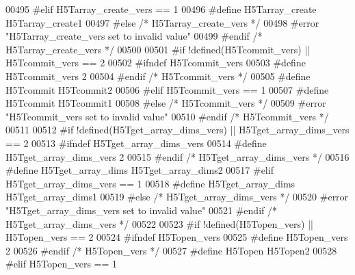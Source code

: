\begin{DoxyCode}
00495 \textcolor{preprocessor}{#elif H5Tarray\_create\_vers == 1}
00496 \textcolor{preprocessor}{  #define H5Tarray\_create H5Tarray\_create1}
00497 \textcolor{preprocessor}{#else }\textcolor{comment}{/* H5Tarray\_create\_vers */}\textcolor{preprocessor}{}
00498 \textcolor{preprocessor}{  #error "H5Tarray\_create\_vers set to invalid value"}
00499 \textcolor{preprocessor}{#endif }\textcolor{comment}{/* H5Tarray\_create\_vers */}\textcolor{preprocessor}{}
00500 
00501 \textcolor{preprocessor}{#if !defined(H5Tcommit\_vers) || H5Tcommit\_vers == 2}
00502 \textcolor{preprocessor}{  #ifndef H5Tcommit\_vers}
00503 \textcolor{preprocessor}{    #define H5Tcommit\_vers 2}
00504 \textcolor{preprocessor}{  #endif }\textcolor{comment}{/* H5Tcommit\_vers */}\textcolor{preprocessor}{}
00505 \textcolor{preprocessor}{  #define H5Tcommit H5Tcommit2}
00506 \textcolor{preprocessor}{#elif H5Tcommit\_vers == 1}
00507 \textcolor{preprocessor}{  #define H5Tcommit H5Tcommit1}
00508 \textcolor{preprocessor}{#else }\textcolor{comment}{/* H5Tcommit\_vers */}\textcolor{preprocessor}{}
00509 \textcolor{preprocessor}{  #error "H5Tcommit\_vers set to invalid value"}
00510 \textcolor{preprocessor}{#endif }\textcolor{comment}{/* H5Tcommit\_vers */}\textcolor{preprocessor}{}
00511 
00512 \textcolor{preprocessor}{#if !defined(H5Tget\_array\_dims\_vers) || H5Tget\_array\_dims\_vers == 2}
00513 \textcolor{preprocessor}{  #ifndef H5Tget\_array\_dims\_vers}
00514 \textcolor{preprocessor}{    #define H5Tget\_array\_dims\_vers 2}
00515 \textcolor{preprocessor}{  #endif }\textcolor{comment}{/* H5Tget\_array\_dims\_vers */}\textcolor{preprocessor}{}
00516 \textcolor{preprocessor}{  #define H5Tget\_array\_dims H5Tget\_array\_dims2}
00517 \textcolor{preprocessor}{#elif H5Tget\_array\_dims\_vers == 1}
00518 \textcolor{preprocessor}{  #define H5Tget\_array\_dims H5Tget\_array\_dims1}
00519 \textcolor{preprocessor}{#else }\textcolor{comment}{/* H5Tget\_array\_dims\_vers */}\textcolor{preprocessor}{}
00520 \textcolor{preprocessor}{  #error "H5Tget\_array\_dims\_vers set to invalid value"}
00521 \textcolor{preprocessor}{#endif }\textcolor{comment}{/* H5Tget\_array\_dims\_vers */}\textcolor{preprocessor}{}
00522 
00523 \textcolor{preprocessor}{#if !defined(H5Topen\_vers) || H5Topen\_vers == 2}
00524 \textcolor{preprocessor}{  #ifndef H5Topen\_vers}
00525 \textcolor{preprocessor}{    #define H5Topen\_vers 2}
00526 \textcolor{preprocessor}{  #endif }\textcolor{comment}{/* H5Topen\_vers */}\textcolor{preprocessor}{}
00527 \textcolor{preprocessor}{  #define H5Topen H5Topen2}
00528 \textcolor{preprocessor}{#elif H5Topen\_vers == 1}

\end{DoxyCode}
